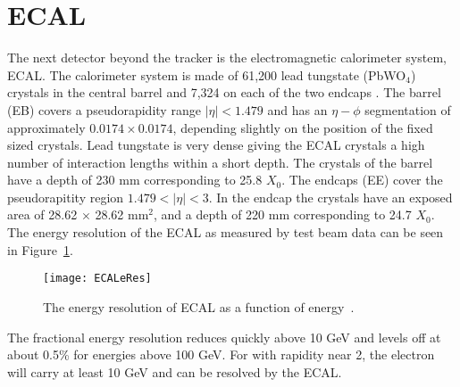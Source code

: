   \section{ECAL}
    The next detector beyond the tracker is the electromagnetic calorimeter 
      system, ECAL.
    The calorimeter system is made of 61,200 lead tungstate (PbWO$_{4}$) 
      crystals in the central barrel and 7,324 on each of the two endcaps 
      \cite{tCmsE}.
    The barrel (EB) covers a pseudorapidity range $|\eta| < 1.479$ and has an
    	$\eta-\phi$ segmentation of approximately $0.0174\times0.0174$, depending
      slightly on the position of the fixed sized crystals.
    Lead tungstate is very dense giving the ECAL crystals a high number of 
      interaction lengths within a short depth.
    The crystals of the barrel have a depth of 230 mm corresponding to 25.8 
    	$X_{0}$.
    The endcaps (EE) cover the pseudorapitity region $1.479 < |\eta| < 3$.
    In the endcap the crystals have an exposed area of 28.62 $\times$ 28.62 
    	mm$^{2}$, and a depth of 220 mm corresponding to 24.7 $X_{0}$.
    The energy resolution of the ECAL as measured by test beam data can be seen in
    	Figure~\ref{ECALeRes}.
    \begin{figure}[!Hhbt]
      \centering
        \texttt{[image: ECALeRes]}
      \caption{The energy resolution of ECAL as a function of energy~\cite{tCmsE}.}
      \label{ECALeRes}
    \end{figure}
    The fractional energy resolution reduces quickly above 10 GeV and levels
      off at about 0.5\% for energies above 100 GeV. 
    For \JPsi{} with rapidity near 2, the electron will carry at least 10 GeV
      and can be resolved by the ECAL. 

